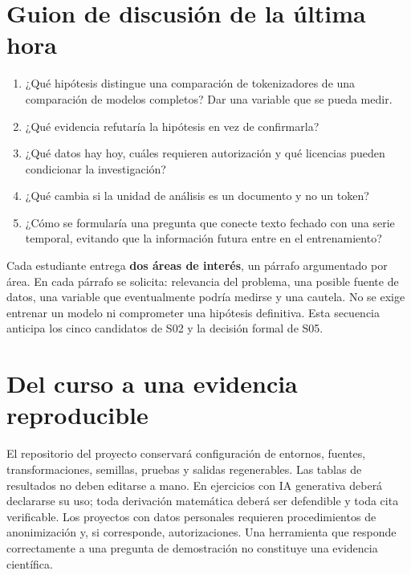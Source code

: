 \section*{Guion de discusión de la última hora}
\begin{enumerate}
\item ¿Qué hipótesis distingue una comparación de tokenizadores de una
 comparación de modelos completos? Dar una variable que se pueda medir.
\item ¿Qué evidencia refutaría la hipótesis en vez de confirmarla?
\item ¿Qué datos hay hoy, cuáles requieren autorización y qué licencias
 pueden condicionar la investigación?
\item ¿Qué cambia si la unidad de análisis es un documento y no un token?
\item ¿Cómo se formularía una pregunta que conecte texto fechado con una
 serie temporal, evitando que la información futura entre en el entrenamiento?
\end{enumerate}
\begin{investigacion}
Cada estudiante entrega \textbf{dos áreas de interés}, un párrafo argumentado
por área. En cada párrafo se solicita: relevancia del problema, una posible
fuente de datos, una variable que eventualmente podría medirse y una cautela.
No se exige entrenar un modelo ni comprometer una hipótesis definitiva.
Esta secuencia anticipa los cinco candidatos de S02 y la decisión formal de S05.
\end{investigacion}

\section*{Del curso a una evidencia reproducible}
El repositorio del proyecto conservará configuración de entornos, fuentes,
transformaciones, semillas, pruebas y salidas regenerables. Las tablas de resultados
no deben editarse a mano. En ejercicios con IA generativa deberá declararse su
uso; toda derivación matemática deberá ser defendible y toda cita verificable.
Los proyectos con datos personales requieren procedimientos de anonimización y,
si corresponde, autorizaciones. Una herramienta que responde correctamente a una
pregunta de demostración no constituye una evidencia científica.
